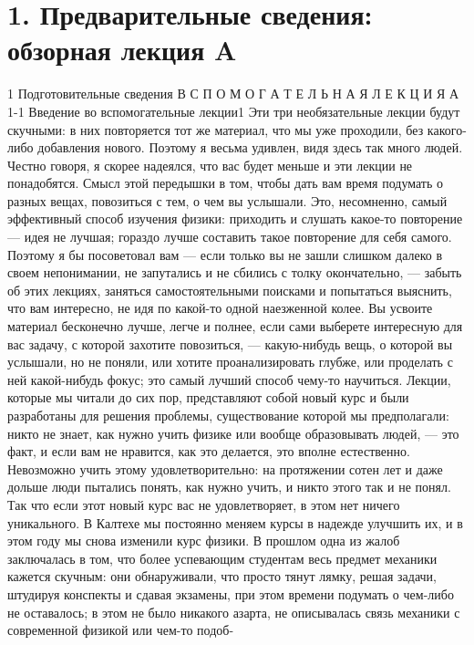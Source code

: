 \documentclass[10pt,oneside]{article}
\begin{document}
\section*{1. Предварительные сведения: обзорная лекция A}
\label{tips-sec-9-1-предварительные-сведения-обзорная-лекция-a}
1 Подготовительные сведения В С П О М О Г А Т Е Л Ь Н А Я  Л Е К Ц И Я  А 1-1 Введение во вспомогательные лекции1 Эти три необязательные лекции будут скучными: в них повторяется тот же материал, что мы уже проходили, без какого-либо добавления нового. Поэтому я весьма удивлен, видя здесь так много людей. Честно говоря, я скорее надеялся, что вас будет меньше и эти лекции не понадобятся. Смысл этой передышки в том, чтобы дать вам время подумать о разных вещах, повозиться с тем, о чем вы услышали. Это, несомненно, самый эффективный способ изучения физики: приходить и слушать какое-то повторение --- идея не лучшая; гораздо лучше составить такое повторение для себя самого. Поэтому я бы посоветовал вам --- если только вы не зашли слишком далеко в своем непонимании, не запутались и не сбились с толку окончательно, --- забыть об этих лекциях, заняться самостоятельными поисками и попытаться выяснить, что вам интересно, не идя по какой-то одной наезженной колее. Вы усвоите материал бесконечно лучше, легче и полнее, если сами выберете интересную для вас задачу, с которой захотите повозиться, --- какую-нибудь вещь, о которой вы услышали, но не поняли, или хотите проанализировать глубже, или проделать с ней какой-нибудь фокус; это самый лучший способ чему-то научиться. Лекции, которые мы читали до сих пор, представляют собой новый курс и были разработаны для решения проблемы, существование которой мы предполагали: никто не знает, как нужно учить физике или вообще образовывать людей, --- это факт, и если вам не нравится, как это делается, это вполне естественно. Невозможно учить этому удовлетворительно: на протяжении сотен лет и даже дольше люди пытались понять, как нужно учить, и никто этого так и не понял. Так что если этот новый курс вас не удовлетворяет, в этом нет ничего уникального. В Калтехе мы постоянно меняем курсы в надежде улучшить их, и в этом году мы снова изменили курс физики. В прошлом одна из жалоб заключалась в том, что более успевающим студентам весь предмет механики кажется скучным: они обнаруживали, что просто тянут лямку, решая задачи, штудируя конспекты и сдавая экзамены, при этом времени подумать о чем-либо не оставалось; в этом не было никакого азарта, не описывалась связь механики с современной физикой или чем-то подоб-\par
\end{document}

